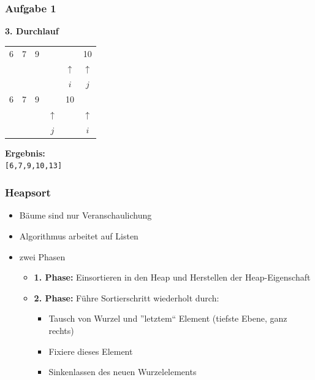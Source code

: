 \documentclass{beamer}
\begin{document}
\begin{frame} \frametitle{Aufgabe 1}
	\centering
	\textbf{3. Durchlauf} \\[1em]
	
	\begin{tabular}{cc||cc||cc}
		6 & 7 & 9 & & \fbox{13} & 10 \\
		& & & & $\uparrow$ & $\uparrow$ \\
		& & & & $i$ & $j$ \\
		
		6 & 7 & 9 & & 10 & \fbox{13} \\
		& & & $\uparrow$ & & $\uparrow$ \\
		& & & $j$ & & $i$ \\
	\end{tabular}
	\vspace{1cm}
	
	\textbf{Ergebnis:} \\
	\texttt{[6,7,9,10,13]}
\end{frame}


\begin{frame} \frametitle{Heapsort}
	\begin{itemize}
		\item Bäume sind nur Veranschaulichung
		\item Algorithmus arbeitet auf Listen
		\item zwei Phasen
		\begin{itemize}
			\item \textbf{1. Phase:} Einsortieren in den Heap und Herstellen der Heap-Eigenschaft
			\item \textbf{2. Phase:} Führe Sortierschritt wiederholt durch:
			\begin{itemize}
				\item Tausch von Wurzel und ''letztem`` Element (tiefste Ebene, ganz rechts)
				\item Fixiere dieses Element
				\item Sinkenlassen des neuen Wurzelelements
			\end{itemize}
		\end{itemize}
	\end{itemize}
\end{frame}
\end{document}
